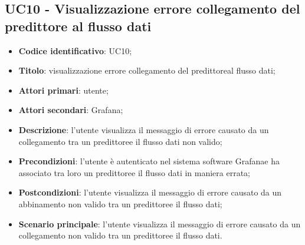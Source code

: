 \subsection{UC10 - Visualizzazione errore collegamento del predittore al flusso dati}
\begin{itemize}
    \item \textbf{Codice identificativo}: UC10;
    \item \textbf{Titolo}: visualizzazione errore collegamento del predittore\glosp al flusso dati;
    \item \textbf{Attori primari}: utente;
    \item \textbf{Attori secondari}: Grafana\glo;
    \item \textbf{Descrizione}: l'utente visualizza il messaggio di errore causato da un collegamento tra un predittore\glosp e il flusso dati non valido;
    \item \textbf{Precondizioni}: l'utente è autenticato nel sistema software Grafana\glosp e ha associato tra loro un predittore\glosp e il flusso dati in maniera errata;
    \item \textbf{Postcondizioni}: l'utente visualizza il messaggio di errore causato da un abbinamento non valido tra un predittore\glosp e il flusso dati;
    \item \textbf{Scenario principale}: l'utente visualizza il messaggio di errore causato da un collegamento non valido tra un predittore\glosp e il flusso dati.
\end{itemize}
